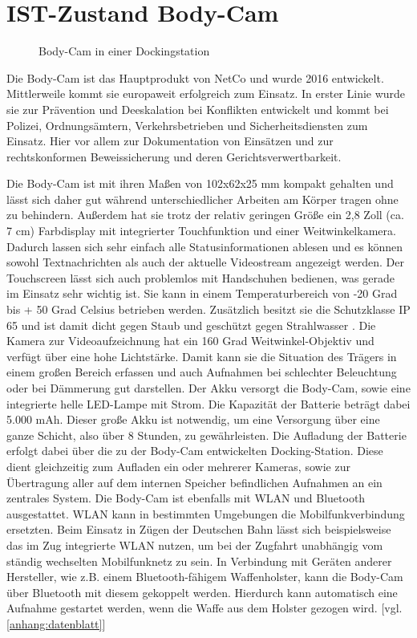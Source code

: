 \documentclass[thesis.tex]{subfiles}
\begin{document}
\section{IST-Zustand Body-Cam}

\begin{figure}[h]
    \centering
    \qquad
    \caption{Body-Cam in einer Dockingstation}
    \label{fig:BC_dock}
\end{figure}

Die Body-Cam ist das Hauptprodukt von NetCo und wurde 2016 entwickelt. Mittlerweile kommt sie europaweit erfolgreich zum Einsatz.
In erster Linie wurde sie zur Prävention und Deeskalation bei Konflikten entwickelt und kommt bei Polizei, Ordnungsämtern, Verkehrsbetrieben und Sicherheitsdiensten zum Einsatz.
Hier vor allem zur Dokumentation von Einsätzen und zur rechtskonformen Beweissicherung und deren Gerichtsverwertbarkeit.

Die Body-Cam ist mit ihren Maßen von 102x62x25 mm kompakt gehalten und lässt sich daher gut während unterschiedlicher Arbeiten am Körper tragen ohne zu behindern.
Außerdem hat sie trotz der relativ geringen Größe ein 2,8 Zoll (ca. 7 cm) Farbdisplay mit integrierter Touchfunktion und einer Weitwinkelkamera. Dadurch lassen sich sehr einfach alle Statusinformationen ablesen und es können sowohl Textnachrichten als auch der aktuelle Videostream angezeigt werden.
Der Touchscreen lässt sich auch problemlos mit Handschuhen bedienen, was gerade im Einsatz sehr wichtig ist.
Sie kann in einem Temperaturbereich von -20 Grad bis + 50 Grad Celsius betrieben werden.
Zusätzlich besitzt sie die Schutzklasse IP 65 und ist damit dicht gegen Staub und geschützt gegen Strahlwasser \cite[S.44]{Elektro_Baugruppen}.
Die Kamera zur Videoaufzeichnung hat ein 160 Grad Weitwinkel-Objektiv und verfügt über eine hohe Lichtstärke.
Damit kann sie die Situation des Trägers in einem großen Bereich erfassen und auch Aufnahmen bei schlechter Beleuchtung oder bei Dämmerung gut darstellen.
Der Akku versorgt die Body-Cam, sowie eine integrierte helle LED-Lampe mit Strom.
Die Kapazität der Batterie beträgt dabei 5.000 mAh.
Dieser große Akku ist notwendig, um eine Versorgung über eine ganze Schicht, also über 8 Stunden, zu gewährleisten.
Die Aufladung der Batterie erfolgt dabei über die zu der Body-Cam entwickelten Docking-Station.
Diese dient gleichzeitig zum Aufladen ein oder mehrerer Kameras, sowie zur Übertragung aller auf dem internen Speicher befindlichen Aufnahmen an ein zentrales System.
Die Body-Cam ist ebenfalls mit WLAN und Bluetooth ausgestattet.
WLAN kann in bestimmten Umgebungen die Mobilfunkverbindung ersetzten.
Beim Einsatz in Zügen der Deutschen Bahn lässt sich beispielsweise das im Zug integrierte WLAN nutzen, um bei der Zugfahrt unabhängig vom ständig wechselten Mobilfunknetz zu sein.
In Verbindung mit Geräten anderer Hersteller, wie z.B. einem Bluetooth-fähigem Waffenholster, kann die Body-Cam über Bluetooth mit diesem gekoppelt werden.
Hierdurch kann automatisch eine Aufnahme gestartet werden, wenn die Waffe aus dem Holster gezogen wird.
[vgl. \autoref{anhang:datenblatt}]
\end{document}
